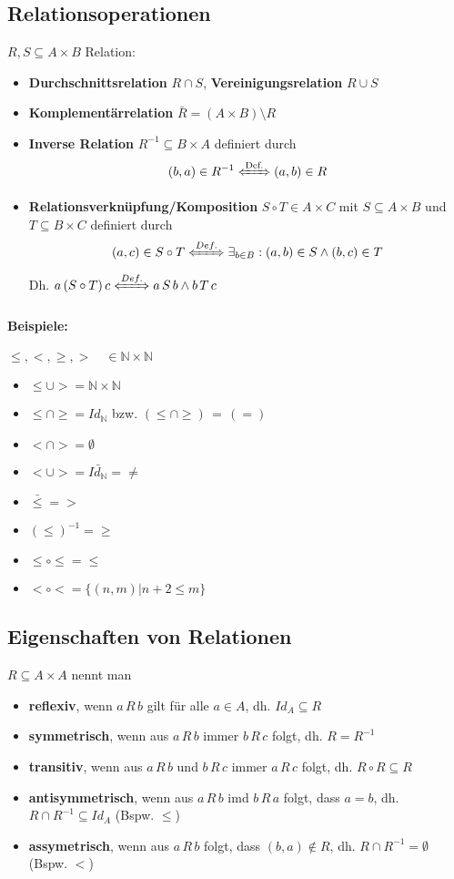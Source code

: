 \documentclass[10pt,a4paper]{article}
\begin{document}
\subsection{Relationsoperationen}
$R,S\subseteq A\times B$ Relation:
\begin{itemize}
\item \textbf{Durchschnittsrelation} $R\cap S$, \textbf{Vereinigungsrelation} $R\cup S$
\item \textbf{Komplementärrelation} $\bar{R}=(A\times B)\setminus R$
\item \textbf{Inverse Relation} $R^{-1}\subseteq B\times A$ definiert durch
\[
(b,a)\in R^{-1} \xLeftrightarrow{\text{Def.}} (a,b)\in R
\]
\item \textbf{Relationsverknüpfung/Komposition} $S\circ T\in A\times C$ mit $S\subseteq A\times B$ und $T\subseteq B\times C$ definiert durch
\[
(a,c)\in S\circ T \xLeftrightarrow{Def.}\exists_{b\in B}: (a,b)\in S \land (b,c)\in T
\]
Dh. $a\, (S\circ T)\, c \xLeftrightarrow{Def.} a\,S\,b \land b\,T\,c$
\end{itemize}

\paragraph{Beispiele:} $\leq,<,\geq,>\quad\in \mathbb{N}\times\mathbb{N}$
\begin{itemize}
\item $\leq\cup > = \mathbb{N}\times\mathbb{N}$
\item $\leq\cap\geq= Id_\mathbb{N}$ bzw. \glqq $(\leq \cap \geq) \,=\, (=)$\grqq 
\item $<\cap > = \emptyset$
\item $<\cup > = \bar{Id_\mathbb{N}} = \neq$
\item $\bar{\leq} = >$
\item $(\leq)^{-1} = \geq $
\item $\leq\circ\leq = \leq$
\item $< \circ < = \{(n,m) | n+2\leq m\}$
\end{itemize}

\subsection{Eigenschaften von Relationen}
$R\subseteq A\times A$ nennt man
\begin{itemize}
\item \textbf{reflexiv}, wenn $a\,R\,b$ gilt für alle $a\in A$, dh. $Id_A \subseteq R$
\item \textbf{symmetrisch}, wenn aus $a\,R\,b$ immer $b\,R\,c$ folgt, dh. $R=R^{-1}$
\item \textbf{transitiv}, wenn aus $a\,R\,b$ und $b\,R\,c$ immer $a\,R\,c$ folgt, dh. $R\circ R\subseteq R$
\item \textbf{antisymmetrisch}, wenn aus $a\,R\,b$ imd $b\,R\,a$ folgt, dass $a=b$, dh. $R\cap R^{-1}\subseteq Id_A$ (Bspw. $\leq$)
\item \textbf{assymetrisch}, wenn aus $a\,R\,b$ folgt, dass $(b,a)\notin R$, dh. $R\cap R^{-1}=\emptyset$ (Bspw. $<$)
\end{itemize}
\end{document}
